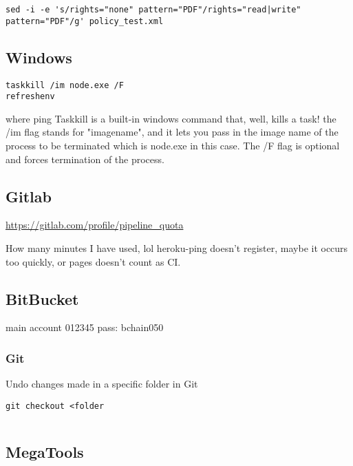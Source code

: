 \begin{verbatim}
sed -i -e 's/rights="none" pattern="PDF"/rights="read|write" pattern="PDF"/g' policy_test.xml
\end{verbatim}

\subsection{Windows}\label{windows}

\begin{verbatim}
taskkill /im node.exe /F
refreshenv
\end{verbatim}

where ping Taskkill is a built-in windows command that, well, kills a
task! the /im flag stands for "imagename", and it lets you pass in the
image name of the process to be terminated which is node.exe in this
case. The /F flag is optional and forces termination of the process.


\subsection{Gitlab}\label{gitlab}

\url{https://gitlab.com/profile/pipeline_quota}

How many minutes I have used, lol heroku-ping doesn't register, maybe it
occurs too quickly, or pages doesn't count as CI.

\subsection{BitBucket}\label{bitbucket}

main account 012345 pass: bchain050

\subsubsection{Git}\label{git}

Undo changes made in a specific folder in Git

\begin{verbatim}
git checkout <folder 
\end{verbatim}

\begin{verbatim}
\end{verbatim}


\subsection{MegaTools}\label{megatools}

